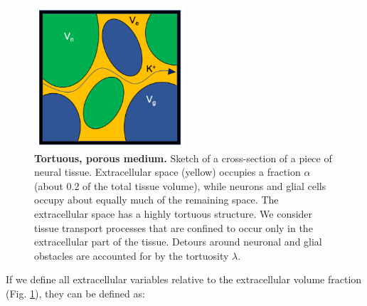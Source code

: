 \begin{figure}[!ht]
\begin{center}
\includegraphics[width=0.5\textwidth]{Figures/Eldiff/Porous.png}
\end{center}
\caption{\textbf{Tortuous, porous medium.}  Sketch of a cross-section of a piece of neural tissue. Extracellular space (yellow) occupies a fraction $\alpha$ (about 0.2 of the total tissue volume), while neurons and glial cells occupy about equally much of the remaining space. The extracellular space has a highly tortuous structure. We consider tissue transport processes that are confined to occur only in the extracellular part of the tissue. Detours around neuronal and glial obstacles are accounted for by the tortuosity $\lambda$. 
}
\label{Eldiff:fig:porous}
\end{figure}

If we define all extracellular variables relative to the extracellular volume fraction  (Fig. \ref{Eldiff:fig:porous}), they can be defined as:

